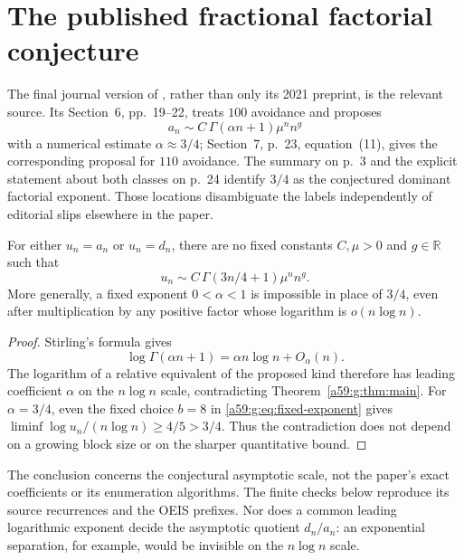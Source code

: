 \documentclass[11pt,letterpaper]{article}
\theoremstyle{remark}\newtheorem{remark}[theorem]{Remark}
\theoremstyle{remark}\newtheorem{wremark}{Remark}\renewcommand{\thewremark}{W\arabic{wremark}}
\theoremstyle{plain}\newtheorem{wcorollary}[wremark]{Corollary}
\begin{document}
\section{The published fractional factorial conjecture}\label{a59:g:sec:conjecture}
The final journal version of \cite{conway}, rather than only its 2021 preprint, is the relevant source. Its Section~6, pp.~19--22, treats $100$ avoidance and proposes
\[
 a_n\sim C\,\Gamma(\alpha n+1)\mu^n n^g
\]
with a numerical estimate $\alpha\approx3/4$; Section~7, p.~23, equation~(11), gives the corresponding proposal for $110$ avoidance. The summary on p.~3 and the explicit statement about both classes on p.~24 identify $3/4$ as the conjectured dominant factorial exponent. Those locations disambiguate the labels independently of editorial slips elsewhere in the paper.

\begin{corollary}\label{a59:g:cor:contradiction}
For either $u_n=a_n$ or $u_n=d_n$, there are no fixed constants $C,\mu>0$ and $g\in\mathbb R$ such that
\begin{equation}\label{a59:g:eq:refuted}
 u_n\sim C\,\Gamma(3n/4+1)\mu^n n^g.
\end{equation}
More generally, a fixed exponent $0<\alpha<1$ is impossible in place of $3/4$, even after multiplication by any positive factor whose logarithm is $o(n\log n)$.
\end{corollary}
\begin{proof}
Stirling's formula gives
\[
 \log\Gamma(\alpha n+1)=\alpha n\log n+O_\alpha(n).
\]
The logarithm of a relative equivalent of the proposed kind therefore has leading coefficient $\alpha$ on the $n\log n$ scale, contradicting Theorem~\ref{a59:g:thm:main}. For $\alpha=3/4$, even the fixed choice $b=8$ in \eqref{a59:g:eq:fixed-exponent} gives $\liminf\log u_n/(n\log n)\geq4/5>3/4$. Thus the contradiction does not depend on a growing block size or on the sharper quantitative bound.
\end{proof}

The conclusion concerns the conjectural asymptotic scale, not the paper's exact coefficients or its enumeration algorithms. The finite checks below reproduce its source recurrences and the OEIS prefixes. Nor does a common leading logarithmic exponent decide the asymptotic quotient $d_n/a_n$: an exponential separation, for example, would be invisible on the $n\log n$ scale.
\end{document}
